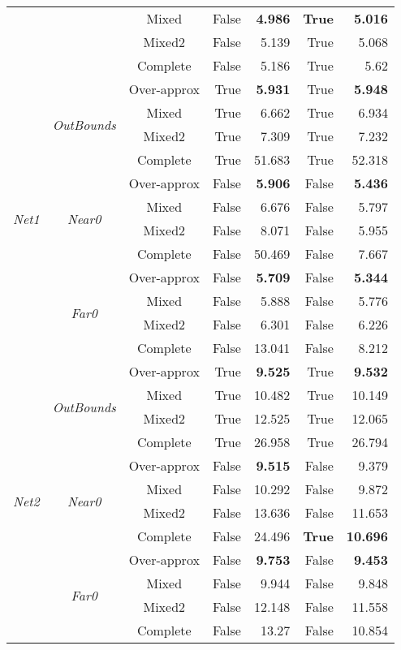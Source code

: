 \begin{table}[t!]
\begin{tabular}{c c c rr rr}
		 & & Mixed & False & \textbf{4.986} & \textbf{True} & \textbf{5.016} \\
		 & & Mixed2 & False & 5.139 & True & 5.068 \\
		 & & Complete & False & 5.186 & True & 5.62 \\
		\midrule
		\multirow{12}{*}{\textit{Net1}} & \multirow{4}{*}{\textit{OutBounds}}
		   & Over-approx & True & \textbf{5.931} & True & \textbf{5.948} \\
		 & & Mixed & True & 6.662 & True & 6.934 \\
		 & & Mixed2 & True & 7.309 & True & 7.232 \\
		 & & Complete & True & 51.683 & True & 52.318 \\
		 \cmidrule{2-7}
		 & \multirow{4}{*}{\textit{Near0}}
		   & Over-approx & False & \textbf{5.906} & False & \textbf{5.436} \\
		 & & Mixed & False & 6.676 & False & 5.797 \\
		 & & Mixed2 & False & 8.071 & False & 5.955 \\
		 & & Complete & False & 50.469 & False & 7.667 \\
		 \cmidrule{2-7}
		   & \multirow{4}{*}{\textit{Far0}} 
		 & Over-approx & False & \textbf{5.709} & False & \textbf{5.344} \\
		 & & Mixed & False & 5.888 & False & 5.776 \\
		 & & Mixed2 & False & 6.301 & False & 6.226 \\
		 & & Complete & False & 13.041 & False & 8.212 \\
		\midrule
		\multirow{12}{*}{\textit{Net2}} & \multirow{4}{*}{\textit{OutBounds}}
		   & Over-approx & True & \textbf{9.525} & True & \textbf{9.532} \\
		 & & Mixed & True & 10.482 & True & 10.149 \\
		 & & Mixed2 & True & 12.525 & True & 12.065 \\
		 & & Complete & True & 26.958 & True & 26.794 \\
		 \cmidrule{2-7}
		 & \multirow{4}{*}{\textit{Near0}}
		   & Over-approx & False & \textbf{9.515} & False & 9.379 \\
		 & & Mixed & False & 10.292 & False & 9.872 \\
		 & & Mixed2 & False & 13.636 & False & 11.653 \\
		 & & Complete & False & 24.496 & \textbf{True} & \textbf{10.696} \\
		 \cmidrule{2-7}
		 & \multirow{4}{*}{\textit{Far0}}
		 & Over-approx & False & \textbf{9.753} & False & \textbf{9.453} \\
		 & & Mixed & False & 9.944 & False & 9.848 \\
		 & & Mixed2 & False & 12.148 & False & 11.558 \\
		 & & Complete & False & 13.27 & False & 10.854 \\
		\bottomrule
	\end{tabular}
\end{table}

